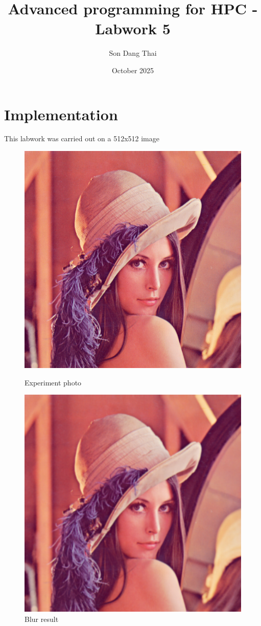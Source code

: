 \documentclass{article}
\title{Advanced programming for HPC - Labwork 5}
\author{Son Dang Thai}
\date{October 2025}
\begin{document}
\maketitle

\section{Implementation}
This labwork was carried out on a 512x512 image

\begin{figure}[!htb]
    \begin{minipage}{0.48\textwidth}
        \centering
        \includegraphics[width=.7\linewidth]{lenna.png}
        \caption{Experiment photo}
        \label{fig:rgb}
    \end{minipage}\hfill
    \begin{minipage}{0.48\textwidth}
        \centering
        \includegraphics[width=.7\linewidth]{lenna_blur_with_shared.png}
        \caption{Blur result}
        \label{fig:blur}
    \end{minipage}\hfill
\end{figure}
\end{document}
